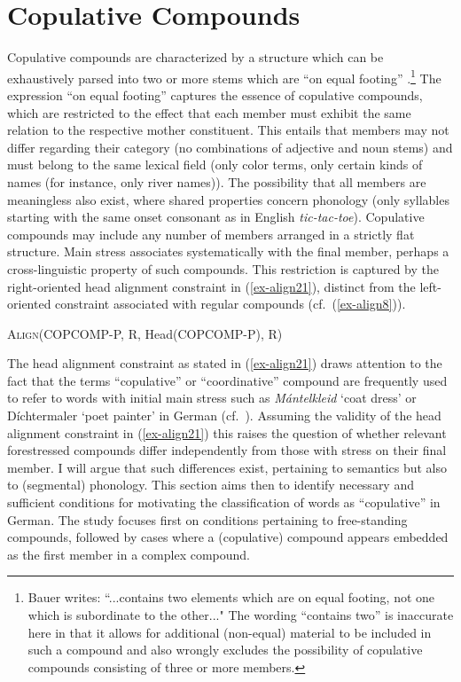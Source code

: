 \documentclass[output=paper
 ,nobabel
 ,draftmode
 ,colorlinks, citecolor=brown
]{langscibook}
\begin{document}
\section{Copulative Compounds}
\label{sec-copcom}

Copulative compounds are characterized by a structure which can be exhaustively parsed into two or more stems which are “on equal footing” \citep[83]{Bauer2017}.\footnote{Bauer writes: “...contains two elements which are on equal footing, not one which is subordinate to the other..." The wording “contains two” is inaccurate here in that it allows for additional (non-equal) material to be included in such a compound and also wrongly excludes the possibility of copulative compounds consisting of three or more members.}
The expression “on equal footing” captures the essence of copulative compounds, which are restricted to the effect that each member must exhibit the same relation to the respective mother constituent. This entails that members may not differ regarding their category (\eg no combinations of adjective and noun stems) and must belong to the same lexical field (\eg only color terms, only certain kinds of names (for instance, only river names)). The possibility that all members are meaningless also exist, where shared properties concern phonology (\eg only syllables starting with the same onset consonant as in English \emph{tic-tac-toe}). Copulative compounds may include any number of members arranged in a strictly flat structure. Main stress associates systematically with the final member, perhaps a cross-linguistic property of such compounds. This restriction is captured by the right-oriented head alignment constraint in (\ref{ex-align21}), distinct from the left-oriented constraint associated with regular compounds (cf.\ (\ref{ex-align8})). 

\ea\label{ex-align21}
\textsc{Align}(COPCOMP-P, R, Head(COPCOMP-P), R)
\z

\noindent
The head alignment constraint as stated in (\ref{ex-align21}) draws attention to the fact that the terms “copulative” or “coordinative” compound are frequently used to refer to words with initial main stress such as \emph{Mántelkleid} `coat dress' or {Díchtermaler} `poet painter' in German (cf.\ \citealp{OrtnerOrtner1984}). Assuming the validity of the head alignment constraint in (\ref{ex-align21}) this raises the question of whether relevant forestressed compounds differ independently  from those with stress on their final member. I will argue that such differences exist, pertaining to semantics but also to (segmental) phonology. This section aims then to identify necessary and sufficient conditions for motivating the classification of words as “copulative” in German. The study focuses first on conditions pertaining to free-standing compounds, followed by cases where a (copulative) compound appears embedded as the first member in a complex compound.  
\end{document}
